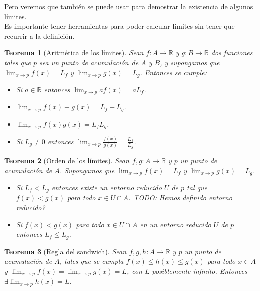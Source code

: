 \documentclass{article}
\newtheorem{theorem}{Teorema}
\newcommand{\reales}{\mathbb{R}}
\begin{document}
Pero veremos que también se puede usar para demostrar la existencia de algunos límites.\\ 
Es importante tener herramientas para poder calcular límites sin tener que recurrir a la definición.

\begin{theorem}[Aritmética de los límites]
	Sean $f: A \rightarrow \reales$ y $g: B \rightarrow \reales$ dos funciones tales que $p$ sea un punto de acumulación de $A$ y $B$, y supongamos que $\lim_{x \rightarrow p} f(x) = L_f$ y $\lim_{x \rightarrow p} g(x) = L_g$. Entonces se cumple:
	\begin{itemize}
		\item
		Si $a \in \reales$ entonces $\lim_{x \rightarrow p} af(x) = aL_f$.
		\item
		$\lim_{x \rightarrow p} f(x) + g(x) = L_f + L_g$.
		\item
		$\lim_{x \rightarrow p} f(x)g(x) = L_f L_g$.
		\item
		Si $L_g \neq 0$ entonces $\lim_{x \rightarrow p} \frac{f(x)}{g(x)} = \frac{L_f}{L_g}$.
	\end{itemize}
\end{theorem}

\begin{theorem}[Orden de los límites]
	Sean $f,g: A \rightarrow \reales$ y $p$ un punto de acumulación de $A$. Supongamos que $\lim_{x\rightarrow p} f(x) = L_f$ y $\lim_{x\rightarrow p} g(x) = L_g$.
	\begin{itemize}
		\item
		Si $L_f < L_g$ entonces existe un entorno reducido $U$ de $p$ tal que $f(x) < g(x)$ para todo $x \in U \cap A$. TODO: Hemos definido entorno reducido?
		\item
		Si $f(x) < g(x)$ para todo $x \in U \cap A$ en un entorno reducido $U$ de $p$ entonces $L_f \leq L_g$.
	\end{itemize}
\end{theorem}

\begin{theorem}[Regla del sandwich]
	Sean $f,g,h: A \rightarrow \reales$ y $p$ un punto de acumulación de $A$, tales que se cumpla $f(x) \leq h(x) \leq g(x)$ para todo $x \in A$ y $\lim_{x\rightarrow p} f(x) = \lim_{x\rightarrow p} g(x) = L$, con $L$ posiblemente infinito. Entonces $\exists \lim_{x\rightarrow p} h(x) = L$.
\end{theorem}
\end{document}
